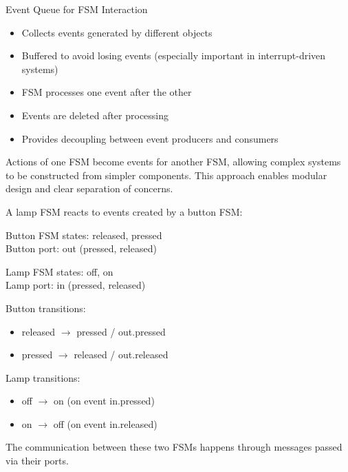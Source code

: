 \begin{concept}{Event Queue for FSM Interaction}
\begin{itemize}
    \item Collects events generated by different objects
    \item Buffered to avoid losing events (especially important in interrupt-driven systems)
    \item FSM processes one event after the other
    \item Events are deleted after processing
    \item Provides decoupling between event producers and consumers
\end{itemize}

Actions of one FSM become events for another FSM, allowing complex systems to be constructed from simpler components. This approach enables modular design and clear separation of concerns.
\end{concept}

\begin{example}
A lamp FSM reacts to events created by a button FSM:

Button FSM states: released, pressed\\
Button port: out (pressed, released)

Lamp FSM states: off, on\\
Lamp port: in (pressed, released)

Button transitions:
\begin{itemize}
    \item released $\rightarrow$ pressed / out.pressed
    \item pressed $\rightarrow$ released / out.released
\end{itemize}

Lamp transitions:
\begin{itemize}
    \item off $\rightarrow$ on (on event in.pressed)
    \item on $\rightarrow$ off (on event in.released)
\end{itemize}

The communication between these two FSMs happens through messages passed via their ports.
\end{example}

